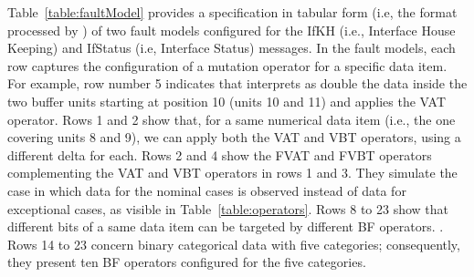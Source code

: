 %



%
%
% 
%
%
%



Table~\ref{table:faultModel} provides a specification in tabular form (i.e, the format processed by \APPR) of two fault models configured for the IfKH (i.e., Interface House Keeping) and IfStatus (i.e, Interface Status) messages. In the fault models, each row captures the configuration of a mutation operator for a specific data item. For example, row number 5 indicates that \APPR interprets as double the data inside the two buffer units starting at position 10 (units 10 and 11) and applies the VAT operator. Rows 1 and 2 show that, for a same numerical data item (i.e., the one covering units 8 and 9), we can apply both the VAT and VBT operators, using a different delta for each. 
Rows 2 and 4 show the FVAT and FVBT operators complementing the VAT and VBT operators in rows 1 and 3. They simulate the case in which data for the nominal cases is observed instead of data for exceptional cases, as visible in Table~\ref{table:operators}.
Rows 8 to 23 show that different bits of a same data item can be targeted by different BF operators. %
. 
Rows 14 to 23 concern binary categorical data with five categories; consequently, they present ten BF operators configured for the five categories.




